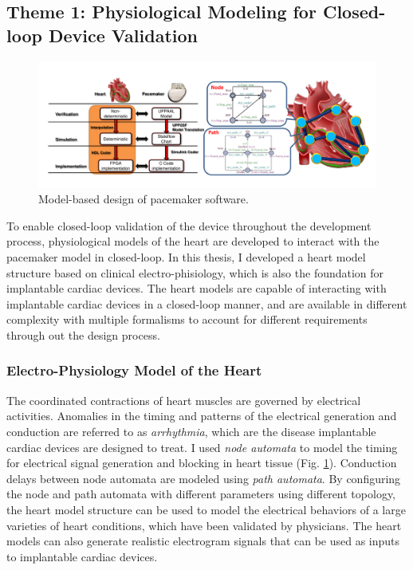 \documentclass[a4paper]{article}
\begin{document}
\subsection{Theme 1: Physiological Modeling for Closed-loop Device Validation}
\begin{figure}[t]
	\centering
	\includegraphics[scale=0.32]{figs/mb_heart.pdf}
	\caption{\small Model-based design of pacemaker software.}
	\label{fig:mb_heart}
\end{figure}
To enable closed-loop validation of the device throughout the development process, physiological models of the heart are developed to interact with the pacemaker model in closed-loop. 
In this thesis, I developed a heart model structure based on clinical electro-phisiology, which is also the foundation for implantable cardiac devices.
The heart models are capable of interacting with implantable cardiac devices in a closed-loop manner, and are available in different complexity with multiple formalisms to account for different requirements through out the design process.
\subsubsection{Electro-Physiology Model of the Heart}
The coordinated contractions of heart muscles are governed by electrical activities.
Anomalies in the timing and patterns of the electrical generation and conduction are referred to as \emph{arrhythmia}, which are the disease implantable cardiac devices are designed to treat.
I used \emph{node automata} to model the timing for electrical signal generation and blocking in heart tissue (Fig. \ref{fig:mb_heart}).
Conduction delays between node automata are modeled using \emph{path automata}.
By configuring the node and path automata with different parameters using different topology, the heart model structure can be used to model the electrical behaviors of a large varieties of heart conditions, which have been validated by physicians. 
The heart models can also generate realistic electrogram signals that can be used as inputs to implantable cardiac devices.
\end{document}
